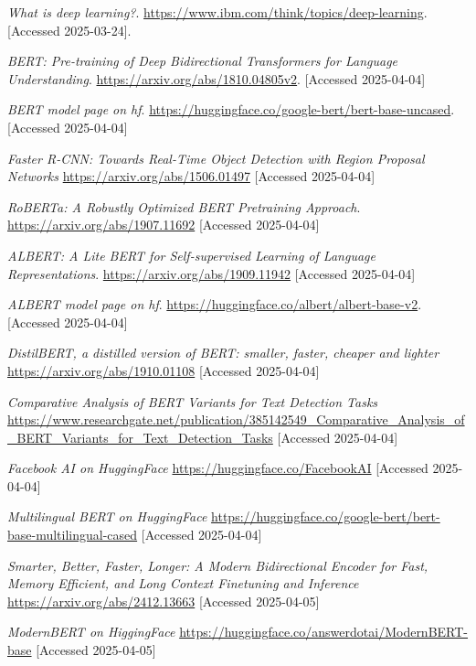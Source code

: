 \documentclass[licencjacka,en]{pracamgr}
\begin{document}
\begin{thebibliography}{99}
\textit{What is deep learning?}.
\url{https://www.ibm.com/think/topics/deep-learning}.
[Accessed 2025-03-24].

\textit{BERT: Pre-training of Deep Bidirectional Transformers for Language Understanding}.
\url{https://arxiv.org/abs/1810.04805v2}.
[Accessed 2025-04-04]

\textit{BERT model page on hf}.
\url{https://huggingface.co/google-bert/bert-base-uncased}.
[Accessed 2025-04-04]

\textit{Faster R-CNN: Towards Real-Time Object Detection with Region Proposal Networks}
\url{https://arxiv.org/abs/1506.01497}
[Accessed 2025-04-04]

\textit{RoBERTa: A Robustly Optimized BERT Pretraining Approach}.
\url{https://arxiv.org/abs/1907.11692}
[Accessed 2025-04-04]

\textit{ALBERT: A Lite BERT for Self-supervised Learning of Language Representations}.
\url{https://arxiv.org/abs/1909.11942}
[Accessed 2025-04-04]

\textit{ALBERT model page on hf}.
\url{https://huggingface.co/albert/albert-base-v2}.
[Accessed 2025-04-04]

\textit{DistilBERT, a distilled version of BERT: smaller, faster, cheaper and lighter}
\url{https://arxiv.org/abs/1910.01108}
[Accessed 2025-04-04]

\textit{Comparative Analysis of BERT Variants for Text Detection Tasks}
\url{https://www.researchgate.net/publication/385142549_Comparative_Analysis_of_BERT_Variants_for_Text_Detection_Tasks}
[Accessed 2025-04-04]

\textit{Facebook AI on HuggingFace}
\url{https://huggingface.co/FacebookAI}
[Accessed 2025-04-04]

\textit{Multilingual BERT on HuggingFace}
\url{https://huggingface.co/google-bert/bert-base-multilingual-cased}
[Accessed 2025-04-04]

\textit{Smarter, Better, Faster, Longer: A Modern Bidirectional Encoder for Fast, Memory Efficient, and Long Context Finetuning and Inference}
\url{https://arxiv.org/abs/2412.13663}
[Accessed 2025-04-05]

\textit{ModernBERT on HiggingFace}
\url{https://huggingface.co/answerdotai/ModernBERT-base}
[Accessed 2025-04-05]


\end{thebibliography}
\end{document}
